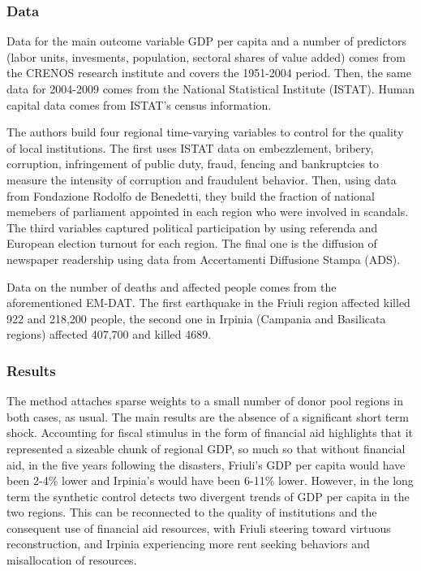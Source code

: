 \documentclass[12pt,a4paper,draft]{article}
\begin{document}
\subsubsection*{Data}
Data for the main outcome variable GDP per capita and a 
number of predictors (labor units, invesments, population, sectoral shares of value added) comes 
from the CRENOS research institute and covers the 1951-2004 period. Then, the same data for 
2004-2009 comes from the National Statistical Institute (ISTAT). Human capital data comes from 
ISTAT's census information.

The authors build four regional time-varying variables to control for the quality of 
local institutions. The first uses ISTAT data on embezzlement, bribery, corruption, infringement 
of public duty, fraud, fencing and bankruptcies to measure the intensity of corruption and 
fraudulent behavior. Then, using data from Fondazione Rodolfo de Benedetti, they build the fraction 
of national memebers of parliament appointed in each region who were involved in scandals. 
The third variables captured political participation by using referenda and European election 
turnout for each region. The final one is the diffusion of newspaper readership using data 
from Accertamenti Diffusione Stampa (ADS).

Data on the number of deaths and affected people comes from the aforementioned EM-DAT. The 
first earthquake in the Friuli region affected killed 922 and 218,200 people, the second one 
in Irpinia (Campania and Basilicata regions) affected 407,700 and killed 4689.

\subsubsection*{Results}
The method attaches sparse weights to a small number of donor pool regions in both cases, as usual.
The main results are the absence of a significant short term shock. Accounting for fiscal stimulus 
in the form of financial aid highlights that it represented a sizeable chunk of regional GDP, so much 
so that without financial aid, in the five years following the disasters, Friuli's GDP per capita would 
have been 2-4\% lower and Irpinia's would have been 6-11\% lower. However, in the long term the synthetic 
control detects two divergent trends of GDP per capita in the two regions. This can be reconnected to 
the quality of institutions and the consequent use of financial aid resources, with Friuli steering 
toward virtuous reconstruction, and Irpinia experiencing more rent seeking behaviors and misallocation 
of resources.  
\end{document}
